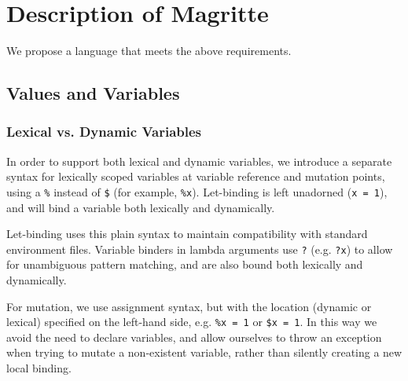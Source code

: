 \ifsigpro{ \documentclass[english,PRO]{ipsj} }
\begin{document}
\section{Description of Magritte}\label{description}\noindent
We propose a language that meets the above requirements.

\subsection{Values and Variables}

\subsubsection{Lexical vs. Dynamic Variables}\noindent
In order to support both lexical and dynamic variables, we introduce a separate syntax for lexically scoped variables at variable reference and mutation points, using a \verb/%/ instead of \verb/$/ (for example, \verb/%x/). Let-binding is left unadorned (\verb/x = 1/), and will bind a variable both lexically and dynamically.

Let-binding uses this plain syntax to maintain compatibility with standard environment files. Variable binders in lambda arguments use \verb/?/ (e.g. \verb/?x/) to allow for unambiguous pattern matching, and are also bound both lexically and dynamically.


For mutation, we use assignment syntax, but with the location (dynamic or lexical) specified on the left-hand side, e.g. \verb/%x = 1/ or \verb/$x = 1/. In this way we avoid the need to declare variables, and allow ourselves to throw an exception when trying to mutate a non-existent variable, rather than silently creating a new local binding.


\end{document}

